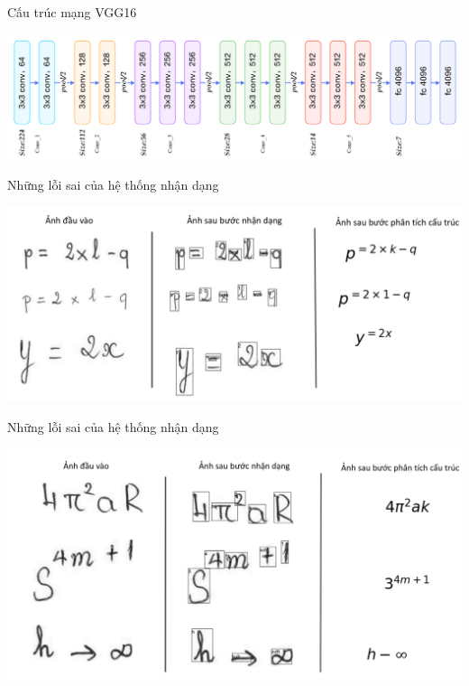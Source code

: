 \documentclass{beamer}
\begin{document}
	\begin{frame}{Cấu trúc mạng VGG16}
		\begin{center}
			\centering
			\includegraphics[width=0.95\linewidth]{vgg16.png}
			\vspace{0.5cm}
		\end{center}
	\end{frame}
	
	\begin{frame}{Những lỗi sai của hệ thống nhận dạng}
			\begin{center}
			\centering
			\includegraphics[width=0.775\linewidth]{phuluc_loi}
			\vspace{0.5cm}
		\end{center}
	\end{frame}
	
	\begin{frame}{Những lỗi sai của hệ thống nhận dạng}
	\begin{center}
		\centering
		\includegraphics[width=0.775\linewidth]{phuluc_sainhan}
		\vspace{0.5cm}
	\end{center}
\end{frame}
	
\end{document}
